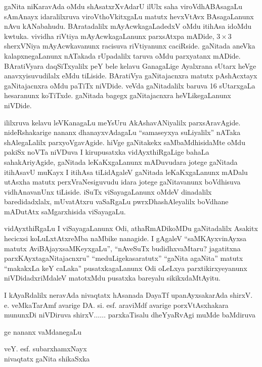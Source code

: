 gaNita niKaravAda oMdu shAsatxrXvAdarU ilUlx saha viroVdhABAsagaLu sAmAnayx idaralilxruva viroVthoVkitxgaLu matutx hevxVtAvx BAsagaLanunx nAvu kANabahudu. BArata\-dalilx mAyAcwkagaLadedxV oMdu itihAsa idoMdu kwtuka. vividha riVtiya mAyA\-cwkagaLanunx parxsAtxpa mADide, $3\times 3$ sherxVNiya mAyAcwkavanunx racisuva riVtiyanunx caciRside. gaNitada aneVka kalapxnegaLanunx nATakada rUpadalilx taruva oMdu parxya\-tanx mADide. BAratiVyara daqSiTxyalilx peY bele kelavu GanagaLige Ayalxrana sUtarx heVge anavxyisuvudilalx eMdu tiLiside. BAratiVya gaNitajacnxra matutx pAshAcxtayx gaNitaja\-cnxra oMdu paTiTx niVDide. veVda gaNitadalilx baruva {\rm 16} sUtarxgaLa hesaranunx koTiTxde. gaNitada bagegx gaNitajacnxra heVLikegaLanunx niVDide.

ililxruva kelavu leVKanagaLu meYsUru AkAshavANiyalilx parxsAravAgide. nideR\-shakarige nananx dhanayxvAdagaLu ``samaseyxya suLiyalilx'' nATaka shAlegaLalilx parxyoVga\-vAgide. hiVge gaNitakekx saMbaMdhisidaMte oMdu pakiSx noVTa niVDuva I kirupusatxka vidAyxthiR\-gaLige bahaLa sahakAriyAgide, gaNitada leKaKxgaLanunx mADuvudara jotege gaNitada itihAsavU muKayx I itihAsa tiLidAgaleV gaNitada leKaKxgaLanunx mADalu utAsxha matutx perxVraNesiguvudu idara jotege gaNitavanunx boVdhisuva vidhAnavanUnx tiLiside. iSuTx viSayagaLanunx oMdeV dinadalilx baredidadxlalx, mUvatAtxru vaSaRgaLu pwrxDhashAle\-yalilx boVdhane mADutAtx saMgarxhisida viSayagaLu.

vidAyxthiRgaLu I viSayagaLanunx Odi, athaRmADikoMDu gaNitadalilx Asakitx\- hecicxsi\- koLuLxtAtxreMba naMbike nanagide. I gAgaleV ``saMKAyxvinAyxsa matutx AviBAjayx\break saMKeyxgaLu'',  ``nAveSuTx budidhxvaMtaru? jagatitxna parxKAyxtagaNitajacnxru'' ``meduLige\break kasaratutx'' ``gaNita agaNita'' matutx ``makakxLa keY caLaka'' pusatxkagaLanunx Odi oLeLxya parxtikirxyeyanunx niVDi\-dadxriMdaleV matotxMdu pusatxka bareyalu sikikxdaMtAyitu.

\begin{center}
\noindent I kAyaRdalilx neravAda nivaqtatx hAsanada DayaTf upanAyxsakarAda shirxV. e. veMkaTarAmf avarige DA. si. esf. araviMdf avarige porxVtAsxhakara mununxDi niVDiruva shirxV$\ldots\ldots$ parxkaTisalu dheYyaRvAgi muMde baMdiruva 
\end{center}

\begin{flushleft}
ge nananx vaMdanegaLu
\end{flushleft}

\begin{flushright}
veY. esf. subarxhamxNayx\\
nivaqtatx gaNita shikaSxka
\end{flushright}

